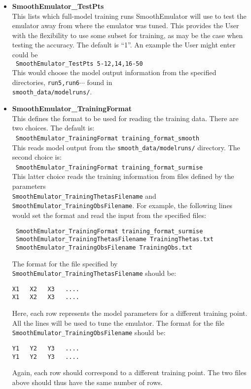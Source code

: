 \documentclass[UserManual.tex]{subfiles}
\begin{document}
\begin{itemize}
\item {\bf SmoothEmulator\_TestPts}\\
This lists which full-model training runs SmoothEmulator will use to test the emulator away from where the emulator was tuned. This provides the User with the flexibility to use some subset for training, as may be the case when testing the accuracy. The default is ``1''. An example the User might enter could be\\
{\tt ~SmoothEmulator\_TestPts 5-12,14,16-50 }\\
This would choose the model output information from the specified directories, {\tt run5,run6}$\cdots$ found in \\{\tt smooth\_data/modelruns/}.

\item {\bf SmoothEmulator\_TrainingFormat}\\
This defines the format to be used for reading the training data. There are two choices. The default is:\\
~{\tt SmoothEmulator\_TrainingFormat training\_format\_smooth}\\
This reads model output from the {\tt smooth\_data/modelruns/} directory. The second choice is:\\
~{\tt SmoothEmulator\_TrainingFormat training\_format\_surmise}\\
This latter choice reads the training information from files defined by the parameters\\
{\tt SmoothEmulator\_TrainingThetasFilename} and {\tt 
 SmoothEmulator\_TrainingObsFilename}. For example, the following lines would set the format and read the input from the specified files:
 
 \vspace*{-8pt}
 {\tt\begin{verbatim}
 SmoothEmulator_TrainingFormat training_format_surmise
 SmoothEmulator_TrainingThetasFilename TrainingThetas.txt
 SmoothEmulator_TrainingObsFilename TrainingObs.txt
 \end{verbatim}}
 \vspace*{-24pt}
The format for the file specified by {\tt SmoothEmulator\_TrainingThetasFilename} should be:
\vspace*{-8pt}
{\tt\begin{verbatim}
X1   X2   X3   ....
X1   X2   X3   ....
\end{verbatim}}
\vspace*{-8pt}
Here, each row represents the model parameters for a different training point. All the lines will be used to tune the emulator. The format for the file {\tt SmoothEmulator\_TrainingObsFilename} should be:
\vspace*{-8pt}
{\tt\begin{verbatim}
Y1   Y2   Y3   ....
Y1   Y2   Y3   ....
\end{verbatim}}
\vspace*{-8pt}
Again, each row should correspond to a different training point. The two files above should thus have the same number of rows.


\end{itemize}
\end{document}
